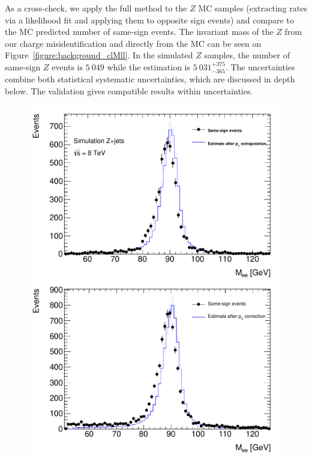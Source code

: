 As a cross-check, we apply the full method to the $Z$ MC samples (extracting rates via a likelihood fit and applying them to opposite sign events) and compare to the MC predicted number of same-sign events. The invariant mass of the $Z$ from our charge misidentification and directly from the MC can be seen on Figure~\ref{figure:background_clMll}. In the simulated $Z$ samples, the number of same-sign $Z$ events is $5~049$ while the estimation is $5~031^{+375}_{-365}$.  The uncertainties combine both statistical systematic uncertainties, which are discussed in depth below. The validation gives compatible results within uncertainties. 
 
\begin{figure}[htb!]
\centering
\begin{minipage}[h]{0.5\textwidth}
    \centering \includegraphics[width=\textwidth]{figs/qmis/ClosureMllMC}
\end{minipage}\hfill
\begin{minipage}[h]{0.5\textwidth}
    \centering \includegraphics[width=\textwidth]{figs/qmis/ClosureMlldata}

\end{minipage}
\end{figure}

